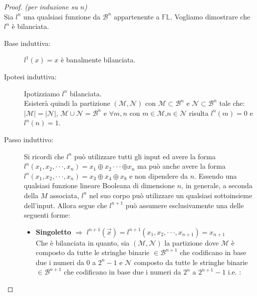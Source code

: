 \documentclass[12pt,a4paper,openright]{report}
\newcommand*\xor{\mathbin{\oplus}}
\begin{document}
\begin{proof} \textit{(per induzione su $n$)\\}
    Sia $l^n$ una qualsiasi funzione da $\mathcal{B}^n$ appartenente a $\mathbb{FL}$.  Vogliamo dimostrare che $l^n$ è bilanciata.\\
    \begin{description}
        \item[Base induttiva:] $l^1(x)=x$ è banalmente bilanciata.
        \item[Ipotesi induttiva:] Ipotizziamo $l^n$ bilanciata.\\
                                      Esisterà quindi la partizione $(\mathcal{M},\mathcal{N})$ con $\mathcal{M}\subset\mathcal{B}^n$ e $\mathcal{N}\subset\mathcal{B}^n$ tale che:\\
                                      ${\left\vert{\mathcal{M}}\right\vert} = {\left\vert{\mathcal{N}}\right\vert}$, $\mathcal{M} \cup \mathcal{N} = \mathcal{B}^n$ e $\forall m,n$ con
                                      $m\in\mathcal{M}$,$n \in\mathcal{N}$ risulta $l^n(m) = 0$ e $ l^n(n) = 1$.
        \item[Passo induttivo:] 
        Si ricordi che $l^n$ può utilizzare tutti gli input ed avere la forma $l^n(x_1,x_2,\cdot\cdot\cdot, x_n) = x_1 \xor x_2 \cdot \cdot \cdot \xor x_n $ ma può anche avere la forma $l^n(x_1,x_2,\cdot\cdot\cdot,x_n) = x_3 \xor x_4 \xor x_8 $ e non dipendere da
        $n$. Essendo una qualsiasi funzione lineare Booleana di dimensione $n$, in generale, a seconda della $M$ associata, $l^n$ nel suo corpo può utilizzare un qualsiasi sottoinsieme dell'input. Allora segue che $l^{n+1}$ può assumere esclusivamente una delle seguenti forme:
                                \begin{itemize}
                                    \item \textbf{Singoletto} $\Rightarrow$ $l^{n+1}(\vec{x}) = l^{n+1}(x_1,x_2,\cdot\cdot\cdot,x_{n+1})=x_{n+1}$\\
                                                              Che è bilanciata in quanto, sia $(\mathcal{M},\mathcal{N})$ la partizione dove $\mathcal{M}$ è composto da tutte le stringhe
                                                              binarie $\in \mathcal{B}^{n+1}$ che codificano in base due i numeri da $0$ a $2^n - 1$ e $\mathcal{N}$ composto da tutte le stringhe binarie
                                                              $\in \mathcal{B}^{n+1}$ che codificano in base due i numeri da $2^n$ a $2^{n+1} - 1$ i.e. :\\

\end{itemize}
\end{description}
\end{proof}
\end{document}
